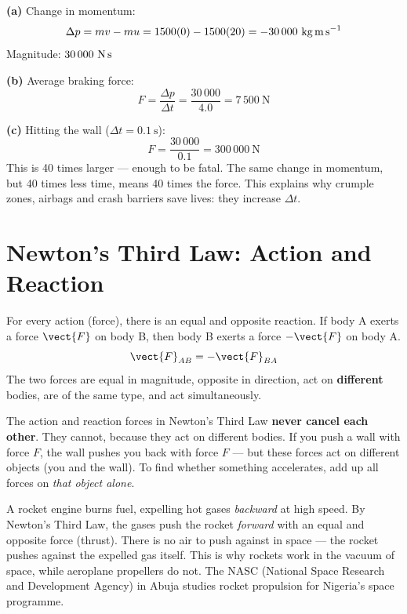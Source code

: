 \begin{solutionbox}
\textbf{(a)} Change in momentum:
\[
  \Delta p = mv - mu = 1500(0) - 1500(20)
  = -30\,000\ \text{kg\,m\,s}^{-1}
\]
Magnitude: $30\,000\ \text{N\,s}$

\textbf{(b)} Average braking force:
\[
  F = \frac{\Delta p}{\Delta t}
  = \frac{30\,000}{4.0} = 7\,500\ \text{N}
\]

\textbf{(c)} Hitting the wall ($\Delta t = 0.1\ \text{s}$):
\[
  F = \frac{30\,000}{0.1} = 300\,000\ \text{N}
\]
This is 40 times larger --- enough to be fatal. The
same change in momentum, but 40 times less time, means
40 times the force. This explains why crumple zones,
airbags and crash barriers save lives: they increase
$\Delta t$.
\end{solutionbox}

\section{Newton's Third Law: Action and Reaction}

\begin{lawbox}
For every action (force), there is an equal and opposite
reaction. If body A exerts a force $\vect{F}$ on body B,
then body B exerts a force $-\vect{F}$ on body A.
\[
  \vect{F}_{AB} = -\vect{F}_{BA}
\]
The two forces are equal in magnitude, opposite in
direction, act on \textbf{different} bodies, are of the
same type, and act simultaneously.
\end{lawbox}

\begin{misconceptionbox}
The action and reaction forces in Newton's Third Law
\textbf{never cancel each other}. They cannot, because
they act on different bodies. If you push a wall with
force $F$, the wall pushes you back with force $F$ ---
but these forces act on different objects (you and the
wall). To find whether something accelerates, add up
all forces on \textit{that object alone}.
\end{misconceptionbox}

\begin{realworldbox}
A rocket engine burns fuel, expelling hot gases
\textit{backward} at high speed. By Newton's Third
Law, the gases push the rocket \textit{forward} with
an equal and opposite force (thrust). There is no air
to push against in space --- the rocket pushes against
the expelled gas itself. This is why rockets work in
the vacuum of space, while aeroplane propellers do not.
The NASC (National Space Research and Development
Agency) in Abuja studies rocket propulsion for Nigeria's
space programme.
\end{realworldbox}

